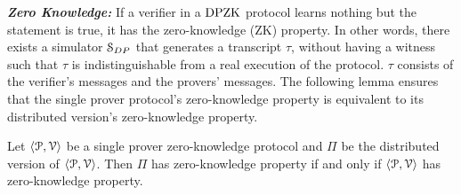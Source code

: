 \noindent\textit{\textbf{Zero Knowledge:}} 
If a verifier in a $\text{DPZK}$ protocol learns nothing but the statement is true, it has the zero-knowledge (ZK) property.
In other words, there exists a simulator $\mathcal{S}_{DP}$ that generates a transcript $\tau$, without having a witness such that $\tau$ is indistinguishable from a real execution of the protocol. $\tau$ consists of the verifier's messages and the provers' messages. The following lemma ensures that the single prover protocol's zero-knowledge property is equivalent to its distributed version's zero-knowledge property.
\begin{lemma}\label{lem:ZK}
	Let $\langle \mathcal{P},\mathcal{V}\rangle$ be a single prover zero-knowledge protocol and $\Pi$ be the distributed version of $\langle \mathcal{P},\mathcal{V}\rangle$. Then $\Pi$ has zero-knowledge property if and only if $\langle \mathcal{P},\mathcal{V}\rangle$ has zero-knowledge property.
\end{lemma}

